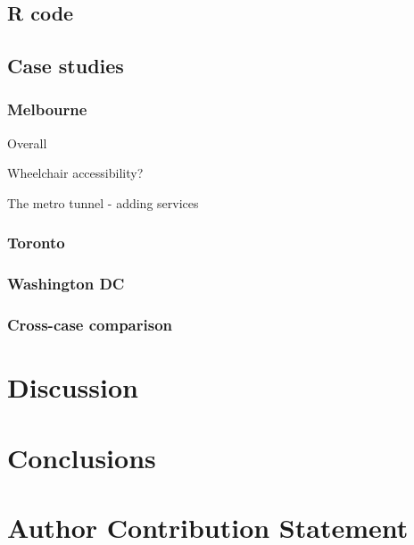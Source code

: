 \documentclass[numbered]{trbunofficial}
\begin{document}
\hypertarget{r-code}{%
\subsection{R code}\label{r-code}}

\hypertarget{case-studies}{%
\subsection{Case studies}\label{case-studies}}

\hypertarget{melbourne}{%
\subsubsection{Melbourne}\label{melbourne}}

Overall

Wheelchair accessibility?

The metro tunnel - adding services

\hypertarget{toronto}{%
\subsubsection{Toronto}\label{toronto}}

\hypertarget{washington-dc}{%
\subsubsection{Washington DC}\label{washington-dc}}

\hypertarget{cross-case-comparison}{%
\subsubsection{Cross-case comparison}\label{cross-case-comparison}}

\hypertarget{discussion}{%
\section{Discussion}\label{discussion}}

\hypertarget{conclusions}{%
\section{Conclusions}\label{conclusions}}

\hypertarget{author-contribution-statement}{%
\section{Author Contribution
Statement}\label{author-contribution-statement}}
\end{document}
